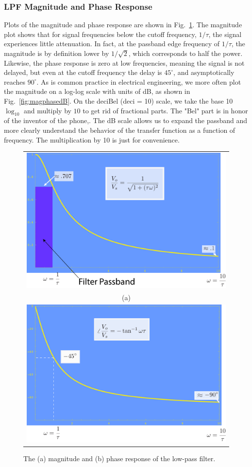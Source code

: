 \subsubsection{LPF Magnitude and Phase Response}
Plots of the magnitude and phase response are shown in Fig.~\ref{fig:magphase}.  The magnitude plot shows that for signal frequencies below the cutoff frequency, $1/\tau$, the signal experiences little attenuation.  In fact, at the passband edge frequency of $1/\tau$, the magnitude is by definition lower by $1/\sqrt{2}$, which corresponds to half the power.  Likewise, the phase response is zero at low frequencies, meaning the signal is not delayed, but even at the cutoff frequency the delay is $45^\circ$, and asymptotically reaches $90^\circ$.
As is common practice in electrical engineering, we more often plot the magnitude on a log-log scale with units of dB,  as shown in Fig.~\ref{fig:magphasedB}.  On the deciBel (deci = 10) scale, we take the base 10 $\log_{10}$ and multiply by $10$ to get rid of fractional parts.  The "Bel" part is in honor of the inventor of the phone,.  The dB scale allows us to expand the passband and more clearly understand the behavior of the transfer function as a function of frequency.  The multiplication by 10 is just for convenience.
\begin{figure}[tbp]
\begin{center}
\begin{tabular}{c}
\includegraphics[width=.6\columnwidth]{mag} \\
(a) \\
\includegraphics[width=.6\columnwidth]{phase} \\
\end{tabular}
\end{center}
\caption{The (a) magnitude and (b) phase response of the low-pass filter. }
\label{fig:magphase}
\end{figure}
